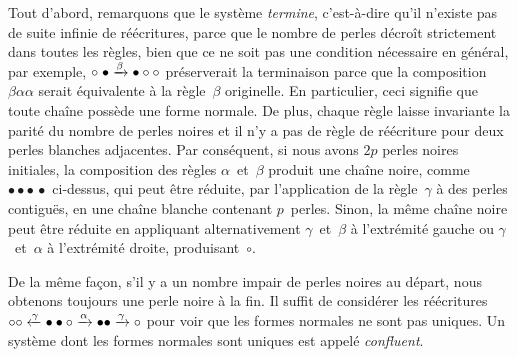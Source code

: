 Tout d'abord, remarquons que le système
\emph{termine}, c'est-à-dire qu'il n'existe pas de
suite infinie de réécritures, parce que le nombre de perles décroît
strictement dans toutes les règles, bien que ce ne soit pas une
condition nécessaire en général, par exemple, \(\circ \; \bullet
\xrightarrow{\smash{\beta}} \bullet \circ \circ\) préserverait la
terminaison parce que la composition \(\beta\alpha\alpha\) serait
équivalente à la règle~\(\beta\) originelle. En particulier, ceci
signifie que toute chaîne possède une forme normale. De plus, chaque
règle laisse invariante la parité du nombre de perles noires et il n'y
a pas de règle de réécriture pour deux perles blanches adjacentes. Par
conséquent, si nous avons \(2p\) perles noires initiales, la
composition des règles \(\alpha\)~et~\(\beta\) produit une chaîne
noire, comme \(\bullet \bullet \bullet \, \bullet\) ci-dessus, qui
peut être réduite, par l'application de la règle~\(\gamma\) à des
perles contiguës, en une chaîne blanche contenant \(p\)~perles. Sinon,
la même chaîne noire peut être réduite en appliquant alternativement
\(\gamma\)~et~\(\beta\) à l'extrémité gauche ou
\(\gamma\)~et~\(\alpha\) à l'extrémité droite, produisant~\(\circ\).

De la même façon, s'il y a un nombre impair de perles noires au
départ, nous obtenons toujours une perle noire à la fin. Il suffit de
considérer les réécritures \(\circ \circ \xleftarrow{\smash{\gamma}}
\bullet \bullet \circ \xrightarrow{\smash{\alpha}} \bullet \bullet
\xrightarrow{\smash{\gamma}} \circ\) pour voir que les formes normales
ne sont pas uniques. Un système dont les formes normales sont uniques
est appelé \emph{confluent}.

